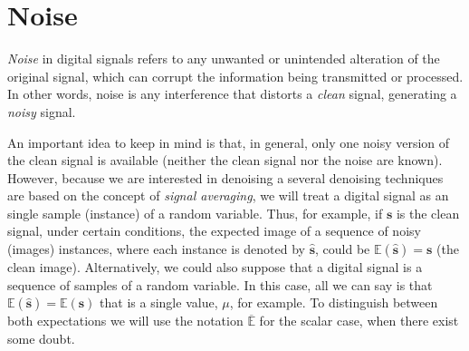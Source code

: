 \chapter{Noise}

\emph{Noise} in digital signals refers to any unwanted or unintended
alteration of the original signal, which can corrupt the information
being transmitted or processed. In other words, noise is any
interference that distorts a \emph{clean} signal, generating a
\emph{noisy} signal.

An important idea to keep in mind is that, in general, only one noisy
version of the clean signal is available (neither the clean signal nor
the noise are known). However, because we are interested in denoising
a several denoising techniques are based on the concept of
\emph{signal averaging}, we will treat a digital signal as an single
sample (instance) of a random variable. Thus, for example, if
$\mathbf{s}$ is the clean signal, under certain conditions, the
expected image of a sequence of noisy (images) instances, where each
instance is denoted by $\hat{\mathbf{s}}$, could be
$\mathbb{E}(\hat{\mathbf{s}})=\mathbf{s}$ (the clean
image). Alternatively, we could also suppose that a digital signal is
a sequence of samples of a random variable. In this case, all we can
say is that $\mathbb{E}(\hat{\mathbf{s}})=\mathbb{E}(\mathbf{s})$ that
is a single value, $\mu$, for example. To distinguish between both
expectations we will use the notation $\overline{\mathbb{E}}$ for the
scalar case, when there exist some doubt.






